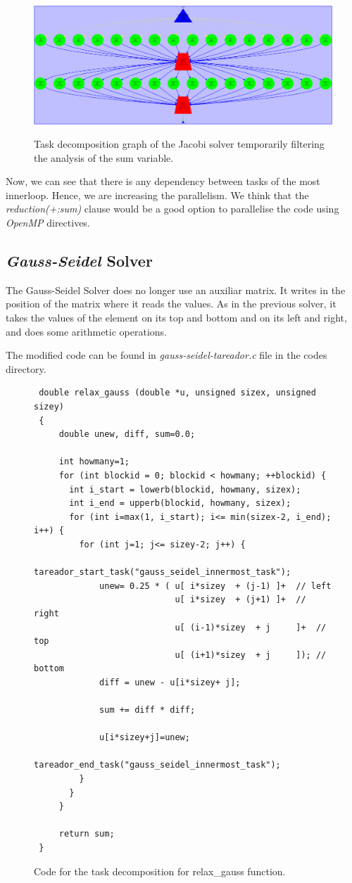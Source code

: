 \documentclass[12pt, a4paper]{article}
\begin{document}
\begin{figure}[H]
	\centering
	\includegraphics[scale=0.35]{./images/tareador-jacobi-2b}
	\label{fig:TDGJacobi-disable-sum}
	\caption{Task decomposition graph of the Jacobi solver temporarily filtering the analysis of the sum variable.}
\end{figure}

Now, we can see that there is any dependency between tasks of the most innerloop. Hence, we are increasing the parallelism. We think that the \textit{reduction(+:sum)} clause would be a good option to parallelise the code using \textit{OpenMP} directives.

\subsection{\textit{Gauss-Seidel} Solver}

The Gauss-Seidel Solver does no longer use an auxiliar matrix. It writes in the position of the matrix where it reads the values. As in the previous solver, it takes the values of the element on its top and bottom and on its left and right, and does some arithmetic operations.

The modified code can be found in \textit{gauss-seidel-tareador.c} file in the codes directory.

\begin{figure}[H]
\begin{lstlisting}
 double relax_gauss (double *u, unsigned sizex, unsigned sizey)
 {
     double unew, diff, sum=0.0; 
 
     int howmany=1;
     for (int blockid = 0; blockid < howmany; ++blockid) {
       int i_start = lowerb(blockid, howmany, sizex);
       int i_end = upperb(blockid, howmany, sizex);
       for (int i=max(1, i_start); i<= min(sizex-2, i_end); i++) {
         for (int j=1; j<= sizey-2; j++) { 
			 tareador_start_task("gauss_seidel_innermost_task");
			 unew= 0.25 * ( u[ i*sizey	+ (j-1) ]+  // left
		 		   		    u[ i*sizey	+ (j+1) ]+  // right
				   		    u[ (i-1)*sizey	+ j     ]+  // top
				   		    u[ (i+1)*sizey	+ j     ]); // bottom
			 diff = unew - u[i*sizey+ j];
			
			 sum += diff * diff; 
			
		 	 u[i*sizey+j]=unew;
			 tareador_end_task("gauss_seidel_innermost_task");
         }
       }
     }

     return sum;
 }
\end{lstlisting}
\label{code:tareador-gauss-seidel}
\caption{Code for the task decomposition for relax\_gauss function.}
\end{figure}
\end{document}
